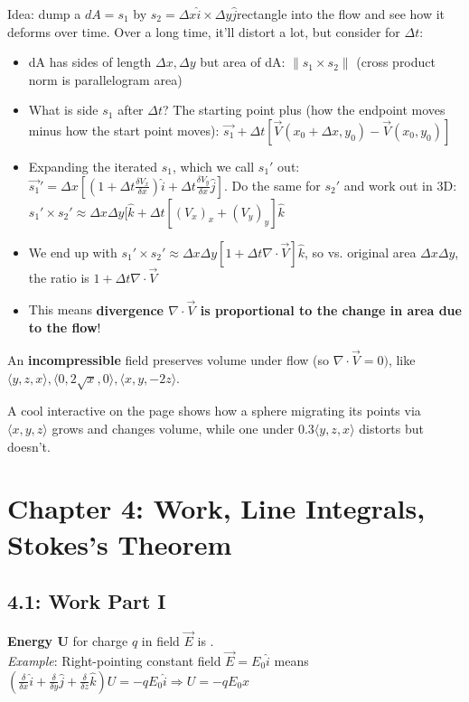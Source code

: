 \documentclass[11pt, oneside]{article}   	%
\begin{document}
Idea: dump a $dA=s_1$ by $s_2 =  \Delta x\hat{i} \times \Delta y\hat{j} $rectangle into the flow and see how it deforms over time.  Over a long time, it'll distort a lot, but consider for $\Delta t$:
\begin{itemize}
\item dA has sides of length $\Delta x, \Delta y$ but area of dA: $\| s_1 \times s_2\|$ (cross product norm is parallelogram area)
\item What is side $s_1$ after $\Delta t$? The starting point plus (how the endpoint moves minus how the start point moves): $\vec{s_1} + \Delta t[\vec{V}(x_0 + \Delta x, y_0) - \vec{V}(x_0, y_0)]$
\item Expanding the iterated $s_1$, which we call $s_1'$ out: $\vec{s_1}' = \Delta x[(1 + \Delta t\frac{\delta V_x}{\delta x})\hat{i} + \Delta t \frac{\delta V_y}{\delta x} \hat{j}]$.  Do the same for $s_2'$ and work out in 3D: $s_1' \times s_2' \approx \Delta x \Delta y [\hat{k} + \Delta t[(V_x)_x + (V_y)_y]\hat{k}$
\item We end up with $s_1' \times s_2' \approx \Delta x \Delta y [1 + \Delta t \nabla \cdot \vec{V}]\hat{k}$, so vs. original area $\Delta x \Delta y$, the ratio is $1 + \Delta t \nabla \cdot \vec{V}$
\item This means \textbf{divergence $\nabla \cdot \vec{V}$ is proportional to the change in area due to the flow}!
\end{itemize}

An \textbf{incompressible} field preserves volume under flow (so $\nabla \cdot \vec{V} = 0)$, like $\langle y, z, x\rangle, \langle 0, 2\sqrt{x}, 0 \rangle,  \langle x, y, -2z \rangle$.

A cool interactive on the page shows how a sphere migrating its points via $\langle x, y, z \rangle$ grows and changes volume, while one under $0.3 \langle  y, z , x \rangle$  distorts but doesn't.

\section{Chapter 4: Work, Line Integrals, Stokes's Theorem}
\subsection{4.1: Work Part I}

\textbf{Energy U} for charge $q$ in field $\vec{E}$ is .
\\
\emph{Example}: Right-pointing constant field $\vec{E} = E_0\hat{i}$ means $(\frac{\delta}{\delta x}\hat{i} + \frac{\delta}{\delta y}\hat{j} + \frac{\delta}{\delta z}\hat{k})U = -qE_0\hat{i} \Rightarrow U = -qE_0x$
\end{document}
